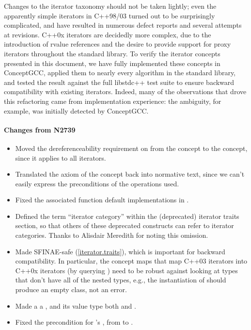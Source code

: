\documentclass[american,twoside]{book}
\begin{document}
\begin{titlepage}
Changes to the iterator taxonomy should not be taken lightly; even the
apparently simple iterators in C++98/03 turned out to be surprisingly
complicated, and have resulted in numerous defect reports and several
attempts at revisions. C++0x iterators are decidedly more complex, due
to the introduction of rvalue references and the desire to provide
support for proxy iterators throughout the standard library. To verify
the iterator concepts presented in this document, we have fully
implemented these concepts in ConceptGCC, applied them to nearly every
algorithm in the standard library, and tested the result against the
full libstdc++ test suite to ensure backward compatibility with
existing iterators. Indeed, many of the observations that drove this
refactoring came from implementation experience: the 
ambiguity, for example, was initially detected by ConceptGCC. 

\paragraph*{Changes from N2739}
\begin{itemize}
\item Moved the dereferenceability requirement on 
  from the  concept to the 
  concept, since it applies to all iterators.
\item Translated the  axiom of the
   concept back into normative text,
  since we can't easily express the preconditions of the operations
  used.
\item Fixed the associated function default implementations in
  .
\item Defined the term ``iterator category'' within the (deprecated)
  iterator traits section, so that others of these deprecated
  constructs can refer to iterator categories. Thanks to Alisdair
  Meredith for noting this omission.
\item Made  SFINAE-safe
  (\ref{iterator.traits}), which is important for backward
  compatibility. In particular, the concept maps that map C++03
  iterators into C++0x iterators (by querying
  \mbox{}) need to be robust against looking at
  types that don't have all of the nested types, e.g., the
  instantiation of  should produce an
  empty class, not an error.
\item Made a  a , and its value type both  and . 
\item Fixed the precondition for 's , from  to .
\end{itemize}
\end{titlepage}
\end{document}
